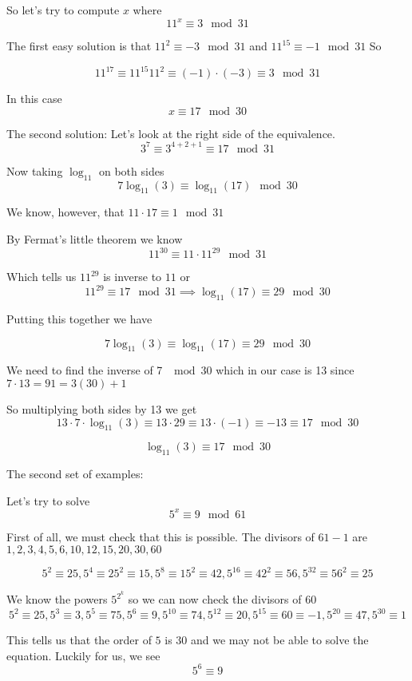\documentclass[16 pt]{amsart}
\theoremstyle{definition}
\theoremstyle{remark}
\numberwithin{equation}{subsection}
\begin{document}
So let's try to compute $x$ where
\[
11^x \equiv 3 \mod{31}
\]

The first easy solution is that $11^2 \equiv -3 \mod{31}$ and $11^{15}\equiv -1 \mod{31}$
So

\[
11^17 \equiv 11^{15} 11^2 \equiv (-1)\cdot(-3) \equiv 3 \mod{31}
\]

In this case
\[
x \equiv 17 \mod{30}
\]

The second solution:  Let's look at the right side of the equivalence.
\[
3^7 \equiv 3^{4+2+1} \equiv 17 \mod{31}
\]

Now taking $\log_{11}$ on both sides
\[
7 \log_{11}(3) \equiv \log_{11}(17) \mod{30}
\]

We know, however, that $11\cdot 17 \equiv 1  \mod{31}$

By Fermat's little theorem we know
\[
11^{30} \equiv 11 \cdot 11^{29} \mod{31}
\]

Which tells us $11^{29}$ is inverse to $11$ or
\[
11^{29}\equiv 17 \mod{31} \implies \log_{11}(17) \equiv 29 \mod{30}
\]

Putting this together we have

\[
7\log_{11}(3) \equiv \log_{11}(17) \equiv 29 \mod{30}
\]

We need to find the inverse of 7 $\mod{30}$ which in our case is 13 since $7\cdot 13 = 91 = 3(30)+1$

So multiplying both sides by 13 we get
\[
13\cdot 7 \cdot \log_{11}(3) \equiv 13\cdot 29 \equiv 13\cdot (-1) \equiv -13 \equiv 17 \mod{30}
\]

\[
\log_{11}(3) \equiv 17 \mod{30}
\]


\newpage

The second set of examples:

Let's try to solve 
\[
5^x \equiv 9  \mod{61}
\]

First of all, we must check that this is possible.  The divisors of $61-1$ are $1,2,3,4,5,6,10,12,15,20,30,60$

\[
5^2 \equiv 25, 5^4 \equiv 25^2 \equiv 15, 5^8 \equiv 15^2 \equiv 42, 5^{16} \equiv 42^2 \equiv 56, 5^{32} \equiv 56^2 \equiv 25
\]


We know the powers $5^{2^k}$ so we can now check the divisors of $60$
\[
5^2 \equiv 25, 5^3\equiv 3, 5^5 \equiv 75, 5^6 \equiv 9, 5^{10} \equiv 74, 5^{12} \equiv 20, 5^{15}\equiv 60 \equiv -1 , 5^{20} \equiv 47, 5^{30} \equiv 1 
\]

This tells us that the order of $5$ is $30$ and we may not be able to solve the equation.  Luckily for us, we see
\[
5^6 \equiv 9
\]
\end{document}
